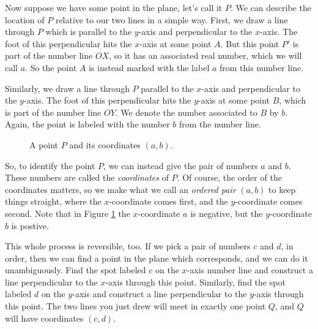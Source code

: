 \documentclass[00-livre-main.tex]{subfiles}
\begin{document}
Now suppose we have some point in the plane, let's call it $P$. 
We can describe the location of $P$ relative to our two lines in a simple way. First, we draw a line through $P$ which is parallel to the $y$-axis and perpendicular to the $x$-axis.
The foot of this perpendicular hits the $x$-axis at some point $A$.
But this point $P'$ is part of the number line $OX$, so it has an associated real number, which we will call $a$.
So the point $A$ is instead marked with the label $a$ from this number line.

Similarly, we draw a line through $P$ parallel to the $x$-axis and perpendicular to the $y$-axis.
The foot of this perpendicular hits the $y$-axis at some point $B$, which is part of the number line $OY$.
We denote the number associated to $B$ by $b$. 
Again, the point is labeled with the number $b$ from the number line.

\begin{figure}[h!]
\centering
{}
\caption{A point $P$ and its coordinates $(a,b)$.}
\label{fig:point-coords}
\end{figure}

So, to identify the point $P$, we can instead give the pair of numbers $a$ and $b$. 
These numbers are called the \emph{coordinates} of $P$.
Of course, the order of the coordinates matters, so we make what we call an \emph{ordered pair} $(a,b)$ to keep things straight, where the $x$-coordinate comes first, and the $y$-coordinate comes second. Note that in Figure \ref{fig:point-coords} the $x$-coordinate $a$ is negative, but the $y$-coordinate $b$ is postive.

This whole process is reversible, too. If we pick a pair of numbers $c$ and $d$, in order, then we can find a point in the plane which corresponds, and we can do it unambiguously. Find the spot labeled $c$ on the $x$-axis number line and construct a line perpendicular to the $x$-axis through this point. Similarly, find the spot labeled $d$ on the $y$-axis and construct a line perpendicular to the $y$-axis through this point. The two lines you just drew will meet in exactly one point $Q$, and $Q$ will have coordinates $(c,d)$.
\end{document}
